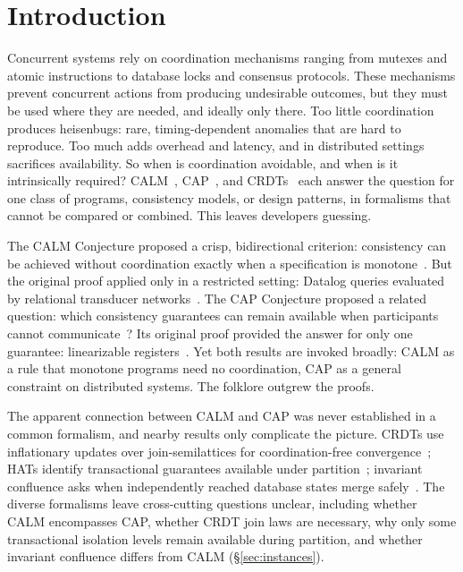 \documentclass[sigconf]{cidr-2027}
\theoremstyle{remark}
\begin{document}
\section{Introduction}
\label{sec:intro}

Concurrent systems rely on coordination mechanisms ranging from mutexes and
atomic instructions to database locks and consensus protocols. These mechanisms
prevent concurrent actions from producing undesirable outcomes, but they must be
used where they are needed, and ideally only there. Too little coordination
produces heisenbugs: rare, timing-dependent anomalies that are hard to
reproduce. Too much adds overhead and latency, and in distributed settings
sacrifices availability. So when is coordination avoidable, and when is it
intrinsically required? CALM~\cite{ameloot2013relational},
CAP~\cite{gilbert2002cap}, and CRDTs~\cite{shapiro2011crdt} each answer the
question for one class of programs, consistency models, or design patterns, in
formalisms that cannot be compared or combined. This leaves developers
guessing.

The CALM Conjecture proposed a crisp, bidirectional criterion: consistency can
be achieved without coordination exactly when a specification is
monotone~\cite{hellerstein2010declarative}. But the original proof applied only
in a restricted setting: Datalog queries evaluated by relational transducer
networks~\cite{ameloot2013relational,hellerstein2020keeping}. The CAP
Conjecture proposed a related question: which consistency guarantees can remain
available when participants cannot
communicate~\cite{brewer2000towards,brewer2012cap}? Its original proof
provided the answer for only one guarantee: linearizable registers~\cite{gilbert2002cap}. Yet both results are invoked broadly: CALM as a
rule that monotone programs need no coordination, CAP as a general constraint
on distributed systems. The folklore outgrew the proofs.

The apparent connection between CALM and CAP was never established in a common
formalism, and nearby results only complicate the picture. CRDTs use
inflationary updates over join-semilattices for coordination-free
convergence~\cite{shapiro2011crdt}; HATs identify transactional guarantees
available under partition~\cite{bailis2013hat}; invariant confluence asks when
independently reached database states merge
safely~\cite{bailis2014coordination}. \textcolor{newblue}{The diverse formalisms leave cross-cutting
questions unclear, including whether CALM encompasses CAP, whether CRDT join
laws are necessary, why only some transactional isolation levels remain
available during partition, and whether invariant confluence differs from CALM
(\S\ref{sec:instances}).}
\end{document}
